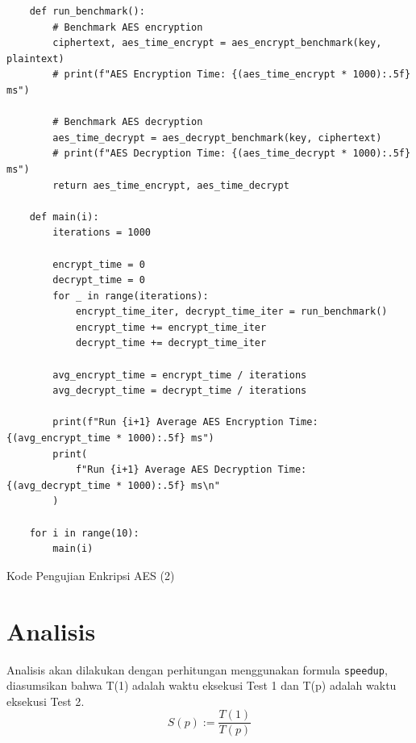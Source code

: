 \begin{listing}[H]
    \begin{verbatim}
    def run_benchmark():
        # Benchmark AES encryption
        ciphertext, aes_time_encrypt = aes_encrypt_benchmark(key, plaintext)
        # print(f"AES Encryption Time: {(aes_time_encrypt * 1000):.5f} ms")

        # Benchmark AES decryption
        aes_time_decrypt = aes_decrypt_benchmark(key, ciphertext)
        # print(f"AES Decryption Time: {(aes_time_decrypt * 1000):.5f} ms")
        return aes_time_encrypt, aes_time_decrypt

    def main(i):
        iterations = 1000

        encrypt_time = 0
        decrypt_time = 0
        for _ in range(iterations):
            encrypt_time_iter, decrypt_time_iter = run_benchmark()
            encrypt_time += encrypt_time_iter
            decrypt_time += decrypt_time_iter

        avg_encrypt_time = encrypt_time / iterations
        avg_decrypt_time = decrypt_time / iterations

        print(f"Run {i+1} Average AES Encryption Time: {(avg_encrypt_time * 1000):.5f} ms")
        print(
            f"Run {i+1} Average AES Decryption Time: {(avg_decrypt_time * 1000):.5f} ms\n"
        )

    for i in range(10):
        main(i)

    \end{verbatim}
    \caption{Kode Pengujian Enkripsi AES (2)}
    \label{code:pengujian_enkripsi_aes_2}
\end{listing}
\section{Analisis}
Analisis akan dilakukan dengan perhitungan menggunakan formula \texttt{speedup}, diasumsikan bahwa T(1) adalah waktu eksekusi Test 1 dan T(p) adalah waktu eksekusi Test 2\cite{beuwolfCetin}.
\[
    S(p) := \frac{T(1)}{T(p)}
\]



